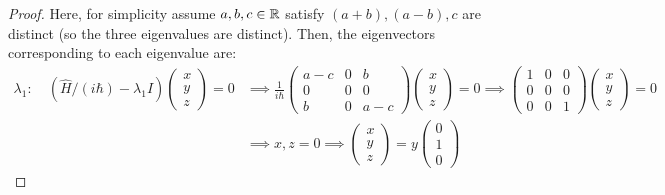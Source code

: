 \documentclass{article}
\begin{document}
\begin{proof}
    Here, for simplicity assume $a,b,c\in\mathbb{R}$ satisfy $(a+b),(a-b),c$ are distinct (so the three eigenvalues are distinct). Then, the eigenvectors corresponding to each eigenvalue are:
    \begin{align}
        \lambda_1:\quad (\hat{H}/(i\hbar) - \lambda_1 I)\begin{pmatrix}
            x\\y\\z
        \end{pmatrix} = 0 &\implies \frac{1}{i\hbar}\begin{pmatrix}
            a-c&0&b\\0&0&0\\b&0&a-c
        \end{pmatrix}\begin{pmatrix}
            x\\y\\z
        \end{pmatrix}=0 \implies \begin{pmatrix}
            1&0&0\\0&0&0\\0&0&1
        \end{pmatrix}\begin{pmatrix}
            x\\y\\z
        \end{pmatrix}=0\\
        &\implies x,z=0 \implies \begin{pmatrix}
            x\\y\\z
        \end{pmatrix} = y\begin{pmatrix}
            0\\1\\0
        \end{pmatrix}
    \end{align}


\end{proof}
\end{document}
